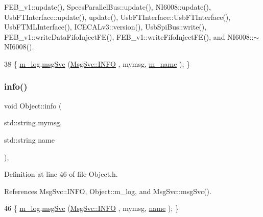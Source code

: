 F\+E\+B\+\_\+v1\+::update(), Specs\+Parallel\+Bus\+::update(), N\+I6008\+::update(), Usb\+F\+T\+Interface\+::update(), update(), Usb\+F\+T\+Interface\+::\+Usb\+F\+T\+Interface(), Usb\+F\+T\+M\+L\+Interface(), I\+C\+E\+C\+A\+Lv3\+::version(), Usb\+Spi\+Bus\+::write(), F\+E\+B\+\_\+v1\+::write\+Data\+Fifo\+Inject\+F\+E(), F\+E\+B\+\_\+v1\+::write\+Fifo\+Inject\+F\+E(), and N\+I6008\+::$\sim$\+N\+I6008().


\begin{DoxyCode}
38 \{ \hyperlink{classObject_a0d269813dd7ac1f24bc143031e2963f2}{m\_log}.\hyperlink{classMsgSvc_ad25f18047920cc59a314e5098259711c}{msgSvc} (\hyperlink{classMsgSvc_ae671eb7301996cd049d2da8a65925926ad2fcf3f3e734fc41ee097cc23670ce51}{MsgSvc::INFO}    , mymsg, \hyperlink{classObject_a8b83c95c705d2c3ba0d081fe1710f48d}{m\_name} ); \}
\end{DoxyCode}
\mbox{\label{classObject_a1ca123253dfd30fc28b156f521dcbdae}} 
\subsubsection{\texorpdfstring{info()}{info()}\hspace{0.1cm}{\footnotesize\ttfamily [2/2]}}
{\footnotesize\ttfamily void Object\+::info (\begin{DoxyParamCaption}\item[{std\+::string}]{mymsg,  }\item[{std\+::string}]{name }\end{DoxyParamCaption})\hspace{0.3cm}{\ttfamily [inline]}, {\ttfamily [inherited]}}



Definition at line 46 of file Object.\+h.



References Msg\+Svc\+::\+I\+N\+FO, Object\+::m\+\_\+log, and Msg\+Svc\+::msg\+Svc().


\begin{DoxyCode}
46 \{ \hyperlink{classObject_a0d269813dd7ac1f24bc143031e2963f2}{m\_log}.\hyperlink{classMsgSvc_ad25f18047920cc59a314e5098259711c}{msgSvc} (\hyperlink{classMsgSvc_ae671eb7301996cd049d2da8a65925926ad2fcf3f3e734fc41ee097cc23670ce51}{MsgSvc::INFO}    , mymsg, \hyperlink{classObject_a300f4c05dd468c7bb8b3c968868443c1}{name} ); \}
\end{DoxyCode}
\mbox{\label{classUsbFTMLInterface_a7f7c96ece97e607b88425823a2923a43}} 
